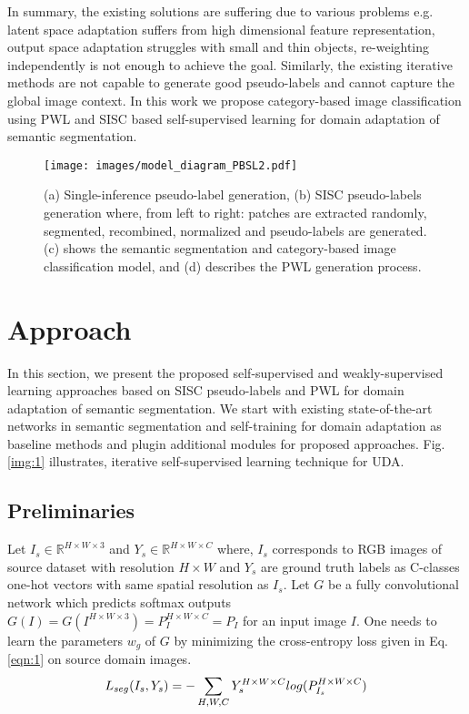 \documentclass[10pt,twocolumn,letterpaper]{article}
\begin{document}
In summary, the existing solutions are suffering due to various problems e.g. latent space adaptation suffers from high dimensional feature representation, output space adaptation struggles with small and thin objects, re-weighting independently is not enough to achieve the goal. Similarly, the existing iterative methods are not capable to generate good pseudo-labels and cannot capture the global image context. In this work we propose category-based image classification using PWL and SISC based self-supervised learning for domain adaptation of semantic segmentation. 
\begin{figure*}[t]
	\centering
	\texttt{[image: images/model\_diagram\_PBSL2.pdf]}
	\caption{(a) Single-inference pseudo-label generation, (b) SISC pseudo-labels generation where, from left to right: patches are extracted randomly, segmented, recombined, normalized and pseudo-labels are generated. (c) shows the semantic segmentation and category-based image classification model, and (d) describes the PWL generation process.}
	\label{img:2}
	\vspace{-0.5cm}
\end{figure*}
\section{Approach}
\label{sec:method}
In this section, we present the proposed self-supervised and weakly-supervised learning approaches based on SISC pseudo-labels and PWL for domain adaptation of semantic segmentation. We start with existing state-of-the-art networks in semantic segmentation \cite{wu2019Resnet38} and self-training for domain adaptation \cite{zou2018unsupervised} as baseline methods and plugin additional modules for proposed approaches.
Fig. \ref{img:1} illustrates, iterative self-supervised learning technique for UDA.

\subsection{Preliminaries}
Let $I_s \in \mathbb{R} ^{H\times W\times 3}$ and $Y_s \in \mathbb{R} ^{H\times W\times C}$ where, $I_s$ corresponds to RGB images of source dataset with resolution $H\times W$ and $Y_s$ are ground truth labels as C-classes one-hot vectors with same spatial resolution as $I_s$. Let $G$ be a fully convolutional network which predicts softmax outputs $G(I) = G(I ^{H\times W\times 3}) = P_I^{H\times W\times C} = P_I$ for an input image $I$. One needs to learn the parameters $w_g$ of $G$ by minimizing the cross-entropy loss given in Eq. \ref{eqn:1} on source domain images.
\vspace{-0.2cm}
\begin{equation}
\small
    L_{seg} (I_s, Y_s) = -\sum_{H, W, C} Y_s^{H\times W\times C} log(P_{I_s}^{H\times W\times C})
\label{eqn:1}
\end{equation}
\vspace{-0.4cm}
\end{document}

